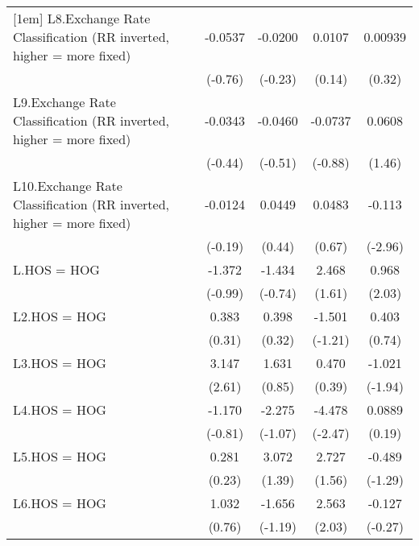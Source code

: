 {\begin{longtable}{l*{4}{c}}
[1em]
L8.Exchange Rate Classification (RR inverted, higher = more fixed)&  -0.0537         &  -0.0200         &   0.0107         &  0.00939         \\
                &  (-0.76)         &  (-0.23)         &   (0.14)         &   (0.32)         \\
[1em]
L9.Exchange Rate Classification (RR inverted, higher = more fixed)&  -0.0343         &  -0.0460         &  -0.0737         &   0.0608         \\
                &  (-0.44)         &  (-0.51)         &  (-0.88)         &   (1.46)         \\
[1em]
L10.Exchange Rate Classification (RR inverted, higher = more fixed)&  -0.0124         &   0.0449         &   0.0483         &   -0.113\sym{**} \\
                &  (-0.19)         &   (0.44)         &   (0.67)         &  (-2.96)         \\
[1em]
L.HOS = HOG     &   -1.372         &   -1.434         &    2.468         &    0.968\sym{*}  \\
                &  (-0.99)         &  (-0.74)         &   (1.61)         &   (2.03)         \\
[1em]
L2.HOS = HOG    &    0.383         &    0.398         &   -1.501         &    0.403         \\
                &   (0.31)         &   (0.32)         &  (-1.21)         &   (0.74)         \\
[1em]
L3.HOS = HOG    &    3.147\sym{**} &    1.631         &    0.470         &   -1.021         \\
                &   (2.61)         &   (0.85)         &   (0.39)         &  (-1.94)         \\
[1em]
L4.HOS = HOG    &   -1.170         &   -2.275         &   -4.478\sym{*}  &   0.0889         \\
                &  (-0.81)         &  (-1.07)         &  (-2.47)         &   (0.19)         \\
[1em]
L5.HOS = HOG    &    0.281         &    3.072         &    2.727         &   -0.489         \\
                &   (0.23)         &   (1.39)         &   (1.56)         &  (-1.29)         \\
[1em]
L6.HOS = HOG    &    1.032         &   -1.656         &    2.563\sym{*}  &   -0.127         \\
                &   (0.76)         &  (-1.19)         &   (2.03)         &  (-0.27)         \\

\end{longtable}}

